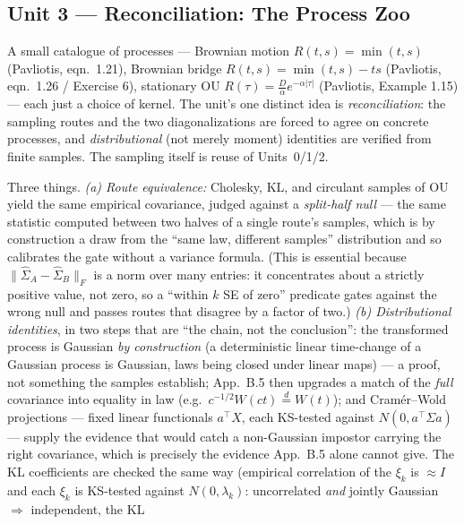 \documentclass[11pt]{article}
\newcommand{\pav}[1]{{\small\color{hubblue}(Pavliotis, #1)}}
\newenvironment{brief}{%
  \begin{description}[style=sameline,leftmargin=2.3cm,font=\bfseries\color{hubblue}]
}{%
  \end{description}
}
\begin{document}
\subsection*{Unit 3 --- Reconciliation: The Process Zoo}
\begin{brief}
\item[Idea] A small catalogue of processes --- Brownian motion $R(t,s)=\min(t,s)$ \pav{eqn.~1.21},
Brownian bridge $R(t,s)=\min(t,s)-ts$ \pav{eqn.~1.26 / Exercise 6}, stationary OU
$R(\tau)=\tfrac{D}{\alpha}e^{-\alpha|\tau|}$ \pav{Example 1.15} --- each just a choice of kernel. The
unit's one distinct idea is \emph{reconciliation}: the sampling routes and the two diagonalizations
are forced to agree on concrete processes, and \emph{distributional} (not merely moment) identities
are verified from finite samples. The sampling itself is reuse of Units~0/1/2.
\item[Proves] Three things. \emph{(a) Route equivalence:} Cholesky, KL, and circulant samples of OU
yield the same empirical covariance, judged against a \emph{split-half null} --- the same statistic
computed between two halves of a single route's samples, which is by construction a draw from the
``same law, different samples'' distribution and so calibrates the gate without a variance formula.
(This is essential because $\|\widehat\Sigma_A-\widehat\Sigma_B\|_F$ is a norm over many entries: it
concentrates about a strictly positive value, not zero, so a ``within $k$ SE of zero'' predicate gates
against the wrong null and passes routes that disagree by a factor of two.) \emph{(b) Distributional
identities}, in two steps that are ``the chain, not the conclusion'': the transformed process is
Gaussian \emph{by construction} (a deterministic linear time-change of a Gaussian process is Gaussian,
laws being closed under linear maps) --- a proof, not something the samples establish; App.~B.5 then
upgrades a match of the \emph{full} covariance into equality in law (e.g.\ $c^{-1/2}W(ct)\overset{d}{=}
W(t)$); and Cram\'er--Wold projections --- fixed linear functionals $a^\top X$, each KS-tested against
$N(0,a^\top\Sigma a)$ --- supply the evidence that would catch a non-Gaussian impostor carrying the
right covariance, which is precisely the evidence App.~B.5 alone cannot give. The KL coefficients are
checked the same way (empirical correlation of the $\xi_k$ is $\approx I$ and each $\xi_k$ is KS-tested
against $N(0,\lambda_k)$: uncorrelated \emph{and} jointly Gaussian $\Rightarrow$ independent, the KL

\end{brief}
\end{document}
